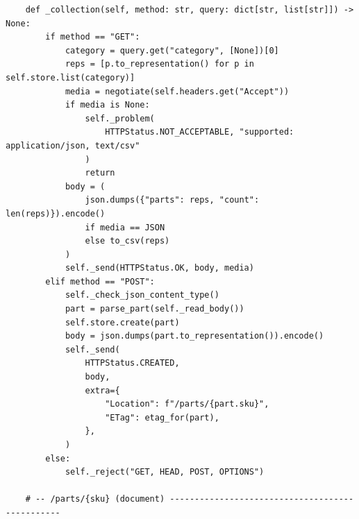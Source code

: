 \begin{verbatim}
    def _collection(self, method: str, query: dict[str, list[str]]) -> None:
        if method == "GET":
            category = query.get("category", [None])[0]
            reps = [p.to_representation() for p in self.store.list(category)]
            media = negotiate(self.headers.get("Accept"))
            if media is None:
                self._problem(
                    HTTPStatus.NOT_ACCEPTABLE, "supported: application/json, text/csv"
                )
                return
            body = (
                json.dumps({"parts": reps, "count": len(reps)}).encode()
                if media == JSON
                else to_csv(reps)
            )
            self._send(HTTPStatus.OK, body, media)
        elif method == "POST":
            self._check_json_content_type()
            part = parse_part(self._read_body())
            self.store.create(part)
            body = json.dumps(part.to_representation()).encode()
            self._send(
                HTTPStatus.CREATED,
                body,
                extra={
                    "Location": f"/parts/{part.sku}",
                    "ETag": etag_for(part),
                },
            )
        else:
            self._reject("GET, HEAD, POST, OPTIONS")

    # -- /parts/{sku} (document) ------------------------------------------------


\end{verbatim}
